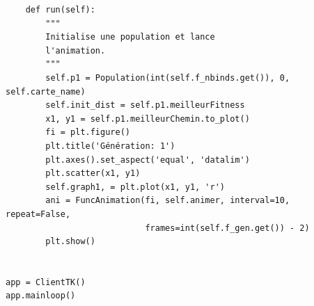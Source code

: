 \documentclass[12pt]{article}
\begin{document}
\begin{verbatim}
    def run(self):
        """
        Initialise une population et lance
        l'animation.
        """
        self.p1 = Population(int(self.f_nbinds.get()), 0, self.carte_name)
        self.init_dist = self.p1.meilleurFitness
        x1, y1 = self.p1.meilleurChemin.to_plot()
        fi = plt.figure()
        plt.title('Génération: 1')
        plt.axes().set_aspect('equal', 'datalim')
        plt.scatter(x1, y1)
        self.graph1, = plt.plot(x1, y1, 'r')
        ani = FuncAnimation(fi, self.animer, interval=10, repeat=False,
                            frames=int(self.f_gen.get()) - 2)
        plt.show()


app = ClientTK()
app.mainloop()
\end{verbatim}
\end{document}
